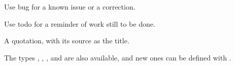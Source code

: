 \begin{bug}
Use bug for a known issue or a correction.
\end{bug}

\begin{todo}
Use todo for a reminder of work still to be done.
\end{todo}

\begin{quotebox}
A quotation, with its source as the title.
\end{quotebox}

The types , , ,  and
 are also available, and new ones can be defined with
\code{\newcallout}.
